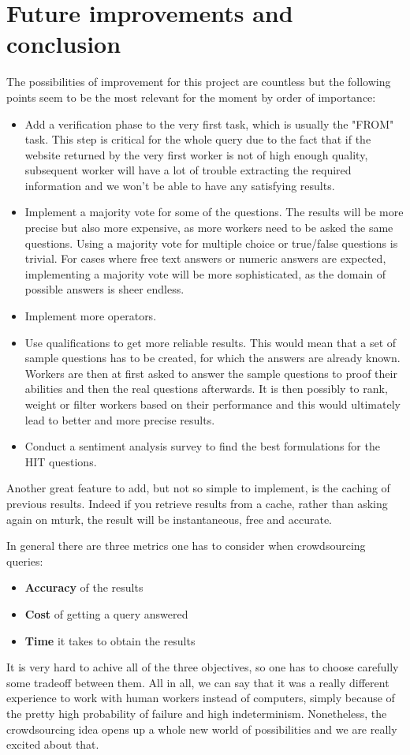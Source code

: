 \documentclass{article}
\begin{document}
\section{Future improvements and conclusion}
The possibilities of improvement for this project are countless but the following points seem to be the most relevant for the moment by order of importance:
\begin{itemize}
\item Add a verification phase to the very first task, which is usually the "FROM" task. This step is critical for the whole query due to the fact that if the website returned by the very first worker is not of high enough quality, subsequent worker will have a lot of trouble extracting the required information and we won't be able to have any satisfying results.
\item Implement a majority vote for some of the questions. The results will be more precise but also more expensive, as more workers need to be asked the same questions. Using a majority vote for multiple choice or true/false questions is trivial. For cases where free text answers or numeric answers are expected, implementing a majority vote will be more sophisticated, as the domain of possible answers is sheer endless.
\item Implement more operators.
\item Use qualifications to get more reliable results. This would mean that a set of sample questions has to be created, for which the answers are already known. Workers are then at first asked to answer the sample questions to proof their abilities and then the real questions afterwards. It is then possibly to rank, weight or filter workers based on their performance and this would ultimately lead to better and more precise results.
\item Conduct a sentiment analysis survey to find the best formulations for the HIT questions.

\end{itemize}
Another great feature to add, but not so simple to implement, is the caching of previous results. Indeed if you retrieve results from a cache, rather than asking again on mturk, the result will be instantaneous, free and accurate.

In general there are three metrics one has to consider when crowdsourcing queries:
\begin{itemize}
\item \textbf{Accuracy} of the results
\item \textbf{Cost} of getting a query answered
\item \textbf{Time} it takes to obtain the results
\end{itemize}
It is very hard to achive all of the three objectives, so one has to choose carefully some tradeoff between them.
All in all, we can say that it was a really different experience to work with human workers instead of computers, simply because of the pretty high probability of failure and high indeterminism. Nonetheless, the crowdsourcing idea opens up a whole new world of possibilities and we are really excited about that.
\end{document}
